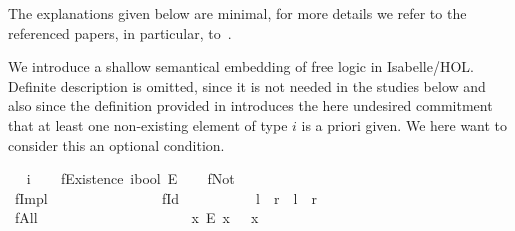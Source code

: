 \begin{isabellebody}
\begin{isamarkuptext}
      The explanations given below are minimal, for more details we refer to the referenced 
      papers, in particular, to~\cite{R58}.%
\end{isamarkuptext}\isamarkuptrue%
%
\isamarkuptrue%
%
\begin{isamarkuptext}%
We introduce a shallow semantical embedding of free logic \cite{R58} in Isabelle/HOL. 
     Definite description is omitted, since it is not needed in the studies below and also
     since the definition provided in \cite{C57} introduces the here undesired commitment 
     that at least one non-existing element of type $i$ is a priori given. We here want to
     consider this an optional condition.%
\end{isamarkuptext}\isamarkuptrue%
\ \isamarkupfalse%
\ i\ %
\isanewline
\ \isamarkupfalse%
\ fExistence{\isacharcolon}{\isacharcolon}\ {\isachardoublequoteopen}i{\isasymRightarrow}bool{\isachardoublequoteclose}\ {\isacharparenleft}{\isachardoublequoteopen}E{\isachardoublequoteclose}{\isacharparenright}\ %
\isanewline
\isanewline
\ \isamarkupfalse%
\ fNot\ \ \ {\isacharparenleft}{\isachardoublequoteopen}\isactrlbold {\isasymnot}{\isachardoublequoteclose}{\isacharparenright}\ \ \ \ \ \ \ \ \ \ \ \ \ \ \ \ {\isachardoublequoteopen}\isactrlbold {\isasymnot}{\isasymphi}\ {\isasymequiv}\ {\isasymnot}{\isasymphi}{\isachardoublequoteclose}\ \ \ \ \ \isanewline
\ \isamarkupfalse%
\ fImpl\ \ {\isacharparenleft}\ {\isachardoublequoteopen}\isactrlbold {\isasymrightarrow}{\isachardoublequoteclose}\ {}{}{\isacharparenright}\ \ \ {\isachardoublequoteopen}{\isasymphi}\ \isactrlbold {\isasymrightarrow}\ {\isasympsi}\ {\isasymequiv}\ {\isasymphi}\ {\isasymlongrightarrow}\ {\isasympsi}{\isachardoublequoteclose}\isanewline
\ \isamarkupfalse%
\ fId\ \ \ \ \ {\isacharparenleft}\ {\isachardoublequoteopen}\isactrlbold {\isacharequal}{\isachardoublequoteclose}\ {}{}{\isacharparenright}\ \ \ \ {\isachardoublequoteopen}l\ \isactrlbold {\isacharequal}\ r\ {\isasymequiv}\ l\ {\isacharequal}\ r{\isachardoublequoteclose}\isanewline
\ \isamarkupfalse%
\ fAll\ \ \ \ {\isacharparenleft}{\isachardoublequoteopen}\isactrlbold {\isasymforall}{\isachardoublequoteclose}{\isacharparenright}\ \ \ \ \ \ \ \ \ \ \ \ \ \ \ \ {\isachardoublequoteopen}\isactrlbold {\isasymforall}{\isasymPhi}\ {\isasymequiv}\ {\isasymforall}x{\isachardot}\ E\ x\ {\isasymlongrightarrow}\ {\isasymPhi}\ x{\isachardoublequoteclose}\ \ \ \isanewline

\end{isabellebody}
